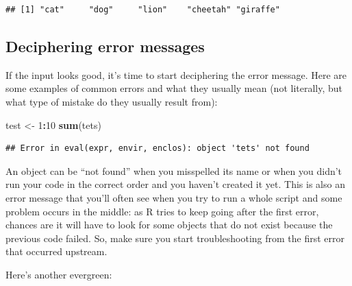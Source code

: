 \documentclass[
]{book}
\newenvironment{Shaded}{\begin{snugshade}}{\end{snugshade}}
\newcommand{\AttributeTok}[1]{\textcolor[rgb]{0.13,0.29,0.53}{#1}}
\newcommand{\DecValTok}[1]{\textcolor[rgb]{0.00,0.00,0.81}{#1}}
\newcommand{\FunctionTok}[1]{\textcolor[rgb]{0.13,0.29,0.53}{\textbf{#1}}}
\newcommand{\NormalTok}[1]{#1}
\newcommand{\OtherTok}[1]{\textcolor[rgb]{0.56,0.35,0.01}{#1}}
\newcommand{\SpecialCharTok}[1]{\textcolor[rgb]{0.81,0.36,0.00}{\textbf{#1}}}
\newcommand{\StringTok}[1]{\textcolor[rgb]{0.31,0.60,0.02}{#1}}
\begin{document}
\begin{verbatim}
## [1] "cat"     "dog"     "lion"    "cheetah" "giraffe"
\end{verbatim}

\hypertarget{deciphering-error-messages}{%
\subsection{Deciphering error messages}\label{deciphering-error-messages}}

If the input looks good, it's time to start deciphering the error message. Here
are some examples of common errors and what they usually mean (not literally,
but what type of mistake do they usually result from):

\begin{Shaded}
\begin{Highlighting}[]
\NormalTok{test }\OtherTok{\textless{}{-}} \DecValTok{1}\SpecialCharTok{:}\DecValTok{10}
\FunctionTok{sum}\NormalTok{(tets)}
\end{Highlighting}
\end{Shaded}

\begin{verbatim}
## Error in eval(expr, envir, enclos): object 'tets' not found
\end{verbatim}

An object can be ``not found'' when you misspelled its name or when you didn't run
your code in the correct order and you haven't created it yet. This is also an
error message that you'll often see when you try to run a whole script and some
problem occurs in the middle: as R tries to keep going after the first error,
chances are it will have to look for some objects that do not exist because the
previous code failed. So, make sure you start troubleshooting from the first
error that occurred upstream.

Here's another evergreen:

\begin{Shaded}
\end{Shaded}
\end{document}
